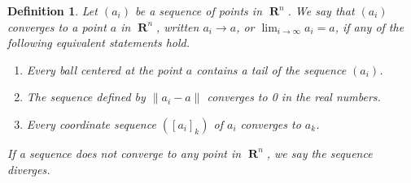 \documentclass{report}
\newtheorem{definition}{Definition}
\DeclareMathOperator{\real}{\mathbf{R}}
\begin{document}
\begin{definition}
  Let $(a_i)$ be a sequence of points in $\real^n$. We say that $(a_i)$ converges to a point $a$ in $\real^n$, written $a_i \to a$, or $\lim_{i \to \infty} a_i = a$, if any of the following equivalent statements hold.
  \begin{enumerate}
    \item Every ball centered at the point $a$ contains a tail of the sequence $(a_i)$.
    \item The sequence defined by $\| a_i - a \|$ converges to 0 in the real numbers.
    \item Every coordinate sequence $([a_i]_k)$ of $a_i$ converges to $a_k$.
  \end{enumerate}
  If a sequence does not converge to any point in $\real^n$, we say the sequence diverges.
\end{definition}
\end{document}
